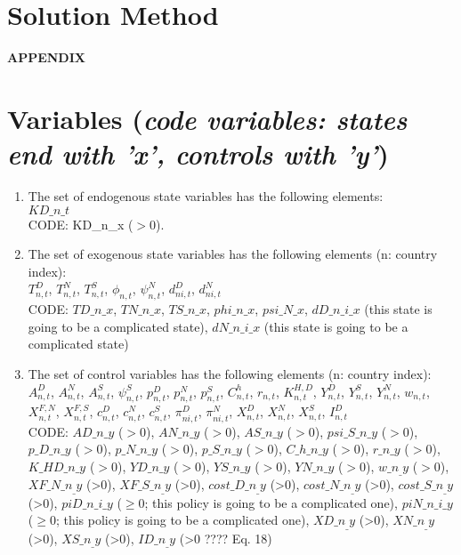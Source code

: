\documentclass[12pt, bibtotoc, tablecaptionabove, figurecaptionabove, fleqn]{article}
\begin{document}
\section{Solution Method}


\newpage
\small



\clearpage\newpage

\appendix
\begin{center}
	\Large
	\textbf{APPENDIX}\\
\end{center}

\normalsize
\section{Variables (\emph{code variables: states end with 'x', controls with 'y'})}

\begin{enumerate}
	\item The set of endogenous state variables has the following elements: \\
	 $KD\_n\_t$\\
	 CODE: KD\_n\_x ($>0$).
	\item The set of exogenous state variables has the following elements (n: country index): \\
	 $T^D_{n,t}$, $T^N_{n,t}$, $T^S_{n,t}$, $\phi_{n,t}$, $\psi_{n,t}^N$, $d^D_{ni,t}$, $d^N_{ni,t}$ \\
	 CODE: $TD\_n\_x$, $TN\_n\_x$, $TS\_n\_x$, $phi\_n\_x$, $psi\_N\_x$, $dD\_n\_i\_x$ (this state is going to be a complicated state), $dN\_n\_i\_x$ (this state is going to be a complicated state) \\
	 
	 \item The set of control variables has the following elements (n: country index): \\
	 $A_{n, t}^{D}$, $A_{n, t}^{N}$, $A_{n, t}^{S}$, $\psi_{n,t}^S$, $p^{D}_{n,t}$, $p^{N}_{n,t}$, $p^{S}_{n,t}$, $C^h_{n,t}$, $r_{n,t}$, $K^{H,D}_{n,t}$, $Y^D_{n,t}$, $Y^S_{n,t}$, $Y^N_{n,t}$, $w_{n,t}$, $X^{F,N}_{n,t}$, $X^{F,S}_{n,t}$, $c^{D}_{n,t}$, $c^{N}_{n,t}$, $c^{S}_{n,t}$, $\pi^D_{ni,t}$, $\pi^N_{ni,t}$, $X^D_{n,t}$, $X^N_{n,t}$, $X^S_{n,t}$, $I^D_{n,t}$\\
	 
	 CODE: $AD\_n\_y$ ($>0$), $AN\_n\_y$ ($>0$), $AS\_n\_y$ ($>0$), 
	 $psi\_S\_n\_y$ ($>0$), $p\_D\_n\_y$ ($>0$), $p\_N\_n\_y$ ($>0$), $p\_S\_n\_y$ ($>0$), $C\_h\_n\_y$ ($>0$), $r\_n\_y$ ($>0$), $K\_HD\_n\_y$ ($>0$), $YD\_n\_y$ ($>0$), $YS\_n\_y$ ($>0$), $YN\_n\_y$ ($>0$), $w\_n_\_y$ ($>0$), $XF\_N\_n_\_y$ (>0), $XF\_S\_n_\_y$ (>0), $cost\_D\_n_\_y$ (>0), $cost\_N\_n_\_y$ (>0), $cost\_S\_n_\_y$ (>0), $piD\_n\_i\_y$ ($\geq 0$; this policy is going to be a complicated one), $piN\_n\_i\_y$ ($\geq 0$; this policy is going to be a complicated one), $XD\_n_\_y$ (>0), $XN\_n_\_y$ (>0), $XS\_n_\_y$ (>0), $ID\_n_\_y$ (>0 ???? Eq. 18)   \\
\end{enumerate}
\end{document}
